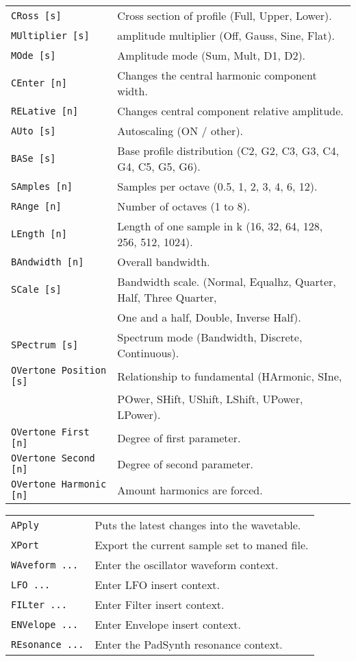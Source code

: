 \begin{table}[H]
\begin{tabular}{l l}
\texttt{CRoss [s]} &
   Cross section of profile (Full, Upper, Lower). \\
\texttt{MUltiplier [s]} &
   amplitude multiplier (Off, Gauss, Sine, Flat). \\
\texttt{MOde [s]} &
   Amplitude mode (Sum, Mult, D1, D2). \\
\texttt{CEnter [n]} &
   Changes the central harmonic component width. \\
\texttt{RELative [n]} &
   Changes central component relative amplitude. \\
\texttt{AUto [s]} &
   Autoscaling (ON / other). \\
\texttt{BASe [s]} &
   Base profile distribution (C2, G2, C3, G3, C4, G4, C5, G5, G6). \\
\texttt{SAmples [n]} &
   Samples per octave (0.5, 1, 2, 3, 4, 6, 12). \\
\texttt{RAnge [n]} &
   Number of octaves (1 to 8). \\
\texttt{LEngth [n]} &
   Length of one sample in k (16, 32, 64, 128, 256, 512, 1024). \\
\texttt{BAndwidth [n]} &
   Overall bandwidth. \\
\texttt{SCale [s]} &
   Bandwidth scale. (Normal, Equalhz, Quarter, Half, Three Quarter,\\
\texttt{} &
   One and a half, Double, Inverse Half).\\
\texttt{SPectrum [s]} &
   Spectrum mode (Bandwidth, Discrete, Continuous). \\
\texttt{OVertone Position [s]} &
   Relationship to fundamental (HArmonic, SIne,\\
\texttt{} &
   POwer, SHift, UShift, LShift, UPower, LPower).\\
\texttt{OVertone First [n]} &
   Degree of first parameter. \\
\texttt{OVertone Second [n]} &
   Degree of second parameter.   \\
\texttt{OVertone Harmonic [n]} &
   Amount harmonics are forced.  \\
      \end{tabular}
   \end{table}
   \begin{table}
      \begin{tabular}{l l}
\texttt{APply} &
   Puts the latest changes into the wavetable. \\
\texttt{XPort} &
   Export the current sample set to maned file. \\
\texttt{WAveform ...} &
   Enter the oscillator waveform context. \\
\texttt{LFO ...} &
   Enter LFO insert context.  \\
\texttt{FILter ...} &
   Enter Filter insert context.  \\
\texttt{ENVelope ...} &
   Enter Envelope insert context.   \\
\texttt{REsonance ...} &
   Enter the PadSynth resonance context. \\
      \end{tabular}
   \end{table}


